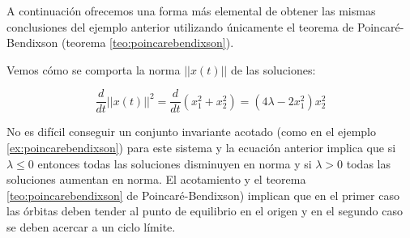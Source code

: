 A continuación ofrecemos una forma más elemental de obtener las mismas conclusiones del ejemplo anterior utilizando únicamente el teorema de Poincaré-Bendixson (teorema \ref{teo:poincarebendixson}).

\begin{example}
Vemos cómo se comporta la norma $||x(t)||$ de las soluciones:

$$
	\dfrac{d}{dt} ||x(t)||^2 = \dfrac{d}{dt}(x_1^2 + x_2^2) = (4\lambda - 2x_1^2)x_2^2
$$

No es difícil conseguir un conjunto invariante acotado (como en el ejemplo \ref{ex:poincarebendixson}) para este sistema y la ecuación anterior implica que si $\lambda \leq 0$ entonces todas las soluciones disminuyen en norma y si $\lambda > 0$ todas las soluciones aumentan en norma.
El acotamiento y el teorema \ref{teo:poincarebendixson} de Poincaré-Bendixson) implican que en el primer caso las órbitas deben tender al punto de equilibrio en el origen y en el segundo caso se deben acercar a un ciclo límite.
\end{example}


